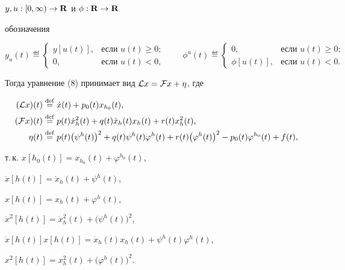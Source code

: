 \begin{exam}
$y,u:[0,\infty)\to\bold {R}$ и $\phi:\bold {R}\to\bold {R}$


обозначения


$$


y_u(t)\eqdef


\begin{cases}


y[u(t)],&\text{если }u(t)\ge 0;\\0,&\text{если }u(t)<0,


\end{cases}


\qquad


\phi^u(t)\eqdef


\begin{cases}


0,&\text{если }u(t)\ge 0;\\ \phi[u(t)],&\text{если }


u(t)<0.


\end{cases}


$$


Тогда уравнение (8) принимает вид ${\cal L}x={\cal F}x+\eta$, где


\begin{align*}


({\cal L}x)(t)&\eqdef\Dot x(t)+p_0(t)x_{h_0}(t),\\


%


({\cal F}x)(t)&\eqdef p(t)\Dot x^2_h(t)+q(t)\Dot


x_h(t)x_h(t)+r(t)x_h^2(t),\\


%


\eta(t)&\eqdef p(t)\big(\psi^h(t)\big)^2+q(t)\psi^h(t)\varphi^h(t)+


r(t)\big(\varphi^h(t)\big)^2-p_0(t)\varphi^{h_0}(t)+f(t),


\end{align*}


т.\,к. $x[h_0(t)]=x_{h_0}(t)+\varphi^{h_0}(t)$,


$\Dot x[h(t)]=\Dot x_h(t)+\psi^h(t)$,


$x[h(t)]=x_h(t)+\varphi^h(t)$,


$\Dot x^2[h(t)]=\Dot x^2_h(t)+\big(\psi^h(t)\big)^2$,


$\Dot x[h(t)]x[h(t)]=\Dot x_h(t)x_h(t)+\psi^h(t)\varphi^h(t)$,


$x^2[h(t)]=x^2_h(t)+\big(\varphi^h(t)\bigr)^2$.






\end{exam}
